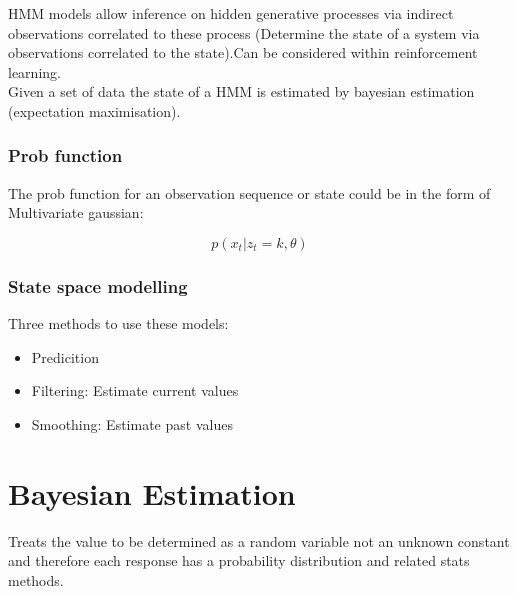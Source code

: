 \documentclass[11pt]{scrartcl} %
\begin{document}
HMM models allow inference on hidden generative processes via indirect observations correlated to these process
(Determine the state of a system via observations correlated to the state).Can be considered within reinforcement learning.\\

Given a set of data the state of a HMM is estimated by bayesian estimation (expectation maximisation).

\subsubsection{Prob function}

The prob function for an observation sequence or state could be in the form of Multivariate gaussian:

\begin{equation}
	p(x_t|z_t=k,\theta)
\end{equation}

\subsubsection{State space modelling}

Three methods to use these models:

\begin{itemize}
	\item Predicition
	\item Filtering: Estimate current values
	\item Smoothing: Estimate past values
\end{itemize}

\section{Bayesian Estimation}

Treats the value to be determined as a random variable not an unknown constant and therefore each response
has a probability distribution and related stats methods.

\newpage

\medskip

\printbibliography

\end{document}
